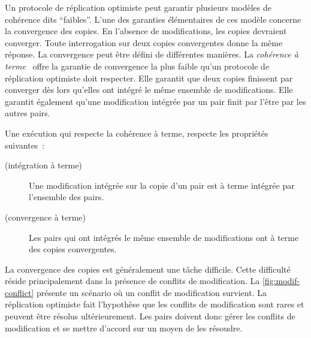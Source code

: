 Un protocole de réplication optimiste peut garantir plusieurs modèles de cohérence dits \enquote{faibles}.
L'une des garanties élémentaires de ces modèle concerne la convergence des copies.
En l'absence de modifications, les copies devraient converger.
Toute interrogation sur deux copies convergentes donne la même réponse.
La convergence peut être défini de différentes manières.
La \emph{cohérence à terme}~\autocite{terry_sessionguarentees_1994,saito_2005_optimisticreplication, vogels_eventuallyconsistent_2009} offre la garantie de convergence la plus faible qu'un protocole de réplication optimiste doit respecter.
Elle garantit que deux copies finissent par converger dès lors qu'elles ont intégré le même ensemble de modifications.
Elle garantit également qu'une modification intégrée par un pair finit par l'être par les autres pairs.

\begin{definition}\label{def:eventual-consistency}
  Une exécution qui respecte la cohérence à terme, respecte les propriétés suivantes~:
  \begin{description}
  \item[ (intégration à terme)] Une modification intégrée sur la copie d'un pair est à terme intégrée par l'ensemble des pairs.
  \item[ (convergence à terme)] Les pairs qui ont intégrés le même ensemble de modifications ont à terme des copies convergentes.
  \end{description}
\end{definition}

La convergence des copies est généralement une tâche difficile.
Cette difficulté réside principalement dans la présence de conflits de modification.
La \autoref{fig:modif-conflict} présente un scénario où un conflit de modification survient.
La réplication optimiste fait l'hypothèse  que les conflits de modification sont rares et peuvent être résolus ultérieurement.
Les pairs doivent donc gérer les conflits de modification et se mettre d'accord sur un moyen de les résoudre.


